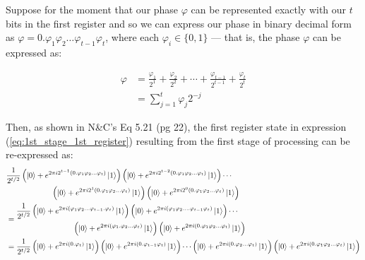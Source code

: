 \documentclass{article}
\begin{document}
\begin{enumerate}[label=\textbf{(\arabic*)}]
Suppose for the moment that our phase $\varphi$ can be represented exactly with our $t$ bits in the first register and so we can express our phase in binary decimal form as $\varphi = 0.\varphi_1 \varphi_2 \ldots \varphi_{t-1}\varphi_{t}$, where each $\varphi_{i}\in\{0, 1\}$ --- that is, the phase $\varphi$ can be expressed as:

\begin{align}
    \varphi
    &=
    \frac{\varphi_1}{2^1} + \frac{\varphi_2}{2^2}
    + \cdots + \frac{\varphi_{t-1}}{2^{t-1}}
    + \frac{\varphi_{t}}{2^{t}}\\
    &=
    \sum_{j=1}^{t} \varphi_{j} 2^{-j}
\end{align}

Then, as shown in N\&C's Eq 5.21 (pg 22), the first register state in expression (\ref{eq:1st_stage_1st_register}) resulting from the first stage of processing can be re-expressed as:
\begin{align}
&\begin{multlined}
    \frac{1}{2^{t/2}}\left(\ket{0}+e^{2\pi i 2^{t-1}(0.\varphi_1\varphi_2\ldots\varphi_{t})}\ket{1}\right)
      \left(\ket{0}+e^{2\pi i 2^{t-2}(0.\varphi_1\varphi_2\ldots\varphi_{t})}\ket{1}\right)
      \cdots\\
      \left(\ket{0}+e^{2\pi i 2^{1} (0.\varphi_{1}\varphi_2\ldots\varphi_{t})}\ket{1}\right)
      \left(\ket{0}+e^{2\pi i 2^0 (0.\varphi_1\varphi_2\ldots\varphi_{t})}\ket{1}\right)
\end{multlined}\\
&=
\begin{multlined}
    \frac{1}{2^{t/2}}\left(\ket{0}+e^{2\pi i (\varphi_1\varphi_2\ldots\varphi_{t-1}.\varphi_{t})}\ket{1}\right)
      \left(\ket{0}+e^{2\pi i (\varphi_1\varphi_2\ldots.\varphi_{t-1}\varphi_{t})}\ket{1}\right)
      \cdots\\
      \left(\ket{0}+e^{2\pi i (\varphi_{1}.\varphi_2\ldots\varphi_{t})}\ket{1}\right)
      \left(\ket{0}+e^{2\pi i (0.\varphi_1\varphi_2\ldots\varphi_{t})}\ket{1}\right)
\end{multlined}\label{eq:leading_digit_not_dropped}\\
&=
    \frac{1}{2^{t/2}}\left(\ket{0}+e^{2\pi i (0.\varphi_{t})}\ket{1}\right)
      \left(\ket{0}+e^{2\pi i (0.\varphi_{t-1}\varphi_{t})}\ket{1}\right)
      \cdots
      \left(\ket{0}+e^{2\pi i (0.\varphi_2\ldots\varphi_{t})}\ket{1}\right)
      \left(\ket{0}+e^{2\pi i (0.\varphi_1\varphi_2\ldots\varphi_{t})}\ket{1}\right)\label{eq:leading_digit_dropped}
\end{align}

\end{enumerate}
\end{document}
